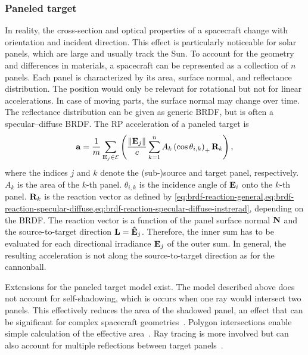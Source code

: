 \subsubsection{Paneled target}
In reality, the cross-section and optical properties of a spacecraft change with orientation and incident direction. This effect is particularly noticeable for solar panels, which are large and usually track the Sun. To account for the geometry and differences in materials, a spacecraft can be represented as a collection of $n$ panels. Each panel is characterized by its area, surface normal, and reflectance distribution. The position would only be relevant for rotational but not for linear accelerations. In case of moving parts, the surface normal may change over time. The reflectance distribution can be given as generic \gls{BRDF}, but is often a specular--diffuse \gls{BRDF}. The \gls{RP} acceleration of a paneled target is~\cite{Marshall1992}
\begin{align}
    \label{eq:paneled-target}
    \vb a = \frac{1}{m} \sum_{\vb E_j \in \mathcal{E}} \left( \frac{\norm{\vb E_j}}{c} \sum_{k=1}^n A_k \left(\cos\theta_{i,k}\right)_+ \vb R_k\right),
\end{align}
where the indices $j$ and $k$ denote the (sub-)source and target panel, respectively. $A_k$ is the area of the $k$-th panel. $\theta_{i,k}$ is the incidence angle of $\vb E_i$ onto the $k$-th panel. $\vb R_k$ is the reaction vector as defined by {\renewcommand\creflastconjunction{ or }\cref{eq:brdf-reaction-general,eq:brdf-reaction-specular-diffuse,eq:brdf-reaction-specular-diffuse-instrerad}}, depending on the \gls{BRDF}. The reaction vector is a function of the panel surface normal $\vb N$ and the source-to-target direction $\vb L = \vu E_j$. Therefore, the inner sum has to be evaluated for each directional irradiance $\vb E_j$ of the outer sum. In general, the resulting acceleration is not along the source-to-target direction as for the cannonball.

Extensions for the paneled target model exist. The model described above does not account for self-shadowing, which is occurs when one ray would intersect two panels. This effectively reduces the area of the shadowed panel, an effect that can be significant for complex spacecraft geometries~\cite{Mazarico2009}. Polygon intersections enable simple calculation of the effective area~\cite{Mazarico2009}. Ray tracing is more involved but can also account for multiple reflections between target panels~\cite{Kenneally2020}.

